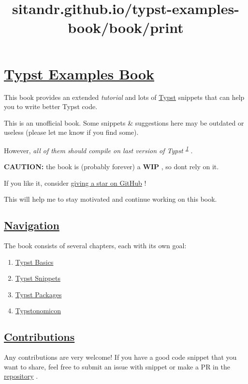 \title{sitandr.github.io/typst-examples-book/book/print}

\section{\texorpdfstring{\hyperref[typst-examples-book]{Typst Examples
Book}}{Typst Examples Book}}\label{typst-examples-book}

This book provides an extended \emph{tutorial} and lots of
\href{https://github.com/typst/typst}{Typst} snippets that can help you
to write better Typst code.

This is an unofficial book. Some snippets \& suggestions here may be
outdated or useless (please let me know if you find some).

However, \emph{all of them should compile on last version of Typst
\textsuperscript{\hyperref[1]{1}}} .

\textbf{CAUTION:} the book is (probably forever) a \textbf{WIP} , so
don\textquotesingle t rely on it.

If you like it, consider
\href{https://github.com/sitandr/typst-examples-book}{giving a star on
GitHub} !

This will help me to stay motivated and continue working on this book.

\subsection{\texorpdfstring{\hyperref[navigation]{Navigation}}{Navigation}}\label{navigation}

The book consists of several chapters, each with its own goal:

\begin{enumerate}
\tightlist
\item
  \href{./basics/index.html}{Typst Basics}
\item
  \href{./snippets/index.html}{Typst Snippets}
\item
  \href{./packages/index.html}{Typst Packages}
\item
  \href{./typstonomicon/index.html}{Typstonomicon}
\end{enumerate}

\subsection{\texorpdfstring{\hyperref[contributions]{Contributions}}{Contributions}}\label{contributions}

Any contributions are very welcome! If you have a good code snippet that
you want to share, feel free to submit an issue with snippet or make a
PR in the
\href{https://github.com/sitandr/typst-examples-book}{repository} .

